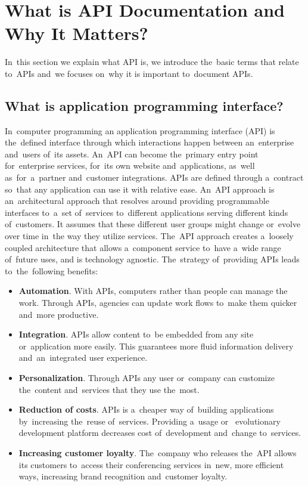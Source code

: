 \section{What is API Documentation and Why It Matters?}
In~this section we explain what API is, we introduce the~basic terms that relate
to~APIs and~we focuses on~why it is important to~document APIs.

\subsection{What is application programming interface?}
In~computer programming an application programming interface (API) is
the~defined interface through which interactions happen between an~enterprise
and~users of~its assets. An~API can become the~primary entry point for~enterprise services, for~its own website
and~applications, as~well as~for~a~partner and~customer integrations. APIs are
defined through a~contract so~that any application can use it with relative
ease. An~API approach is an~architectural approach that resolves around
providing programmable interfaces to~a~set of~services to~different applications
serving different kinds of~customers. It assumes that these different user
groups might change or~evolve over time in~the way they utilize services.
The~API approach creates a~loosely coupled architecture that allows a~component
service to~have a~wide range of~future uses, and is technology agnostic.
The~strategy of~providing APIs leads to~the~following benefits:

\begin{itemize}
  \item \textbf{Automation}. With APIs, computers rather than people can manage
  the work. Through APIs, agencies can update work flows to~make them quicker
  and~more productive.
  \item \textbf{Integration}. APIs allow content to~be embedded from any site
  or~application more easily. This guarantees more fluid information delivery
  and~an~integrated user experience.
  \item \textbf{Personalization}. Through APIs any user or~company can customize
  the~content and~services that they use the~most.
  \item \textbf{Reduction of costs}. APIs is a~cheaper way of~building
  applications by~increasing the~reuse of~services. Providing a~usage or~
  evolutionary development platform decreases cost of~development and~change
  to~services.
  \item \textbf{Increasing customer loyalty}. The~company who releases
  the~API allows its customers to~access their conferencing services in~new,
  more efficient ways, increasing brand recognition and~customer loyalty.
\end{itemize}


